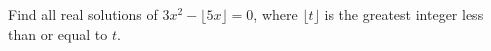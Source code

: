 Find all real solutions of $3x^2-\lfloor5x\rfloor=0$, where $\lfloor t\rfloor$ is the greatest integer less than or equal to $t$.
